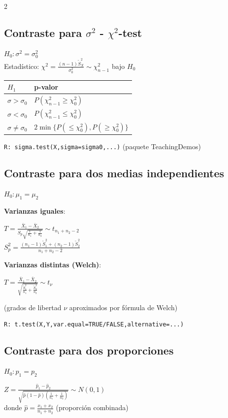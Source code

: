 \documentclass[9pt,a4paper]{article}
\newcommand{\R}{\texttt{R: }}
\begin{document}
\begin{multicols}{2}
\subsection{Contraste para $\sigma^2$ - $\chi^2$-test}
$H_0:\sigma^2=\sigma_0^2$\\
Estadístico: $\chi^2=\frac{(n-1)\tilde{S}^2_X}{\sigma_0^2}\sim\chi^2_{n-1}$ bajo $H_0$

\begin{center}
\begin{tabular}{@{}l|l@{}}
$H_1$ & p-valor\\
\hline
$\sigma>\sigma_0$ & $P(\chi^2_{n-1}\geq\chi^2_0)$\\
$\sigma<\sigma_0$ & $P(\chi^2_{n-1}\leq\chi^2_0)$\\
$\sigma\neq\sigma_0$ & $2\min\{P(\leq\chi^2_0),P(\geq\chi^2_0)\}$
\end{tabular}
\end{center}

\R\texttt{sigma.test(X,sigma=sigma0,...)} (paquete TeachingDemos)

\subsection{Contraste para dos medias independientes}
$H_0:\mu_1=\mu_2$

\textbf{Varianzas iguales}:
\begin{formulabox}
$T=\frac{\bar{X}_1-\bar{X}_2}{S_p\sqrt{\frac{1}{n_1}+\frac{1}{n_2}}}\sim t_{n_1+n_2-2}$\\[5pt]
$S_p^2=\frac{(n_1-1)\tilde{S}_1^2+(n_2-1)\tilde{S}_2^2}{n_1+n_2-2}$
\end{formulabox}

\textbf{Varianzas distintas (Welch)}:
\begin{formulabox}
$T=\frac{\bar{X}_1-\bar{X}_2}{\sqrt{\frac{\tilde{S}_1^2}{n_1}+\frac{\tilde{S}_2^2}{n_2}}}\sim t_\nu$
\end{formulabox}
(grados de libertad $\nu$ aproximados por fórmula de Welch)

\R\texttt{t.test(X,Y,var.equal=TRUE/FALSE,alternative=...)}

\subsection{Contraste para dos proporciones}
$H_0:p_1=p_2$
\begin{formulabox}
$Z=\frac{\hat{p}_1-\hat{p}_2}{\sqrt{\hat{p}(1-\hat{p})(\frac{1}{n_1}+\frac{1}{n_2})}}\sim N(0,1)$\\[5pt]
donde $\hat{p}=\frac{x_1+x_2}{n_1+n_2}$ (proporción combinada)
\end{formulabox}


\end{multicols}
\end{document}
